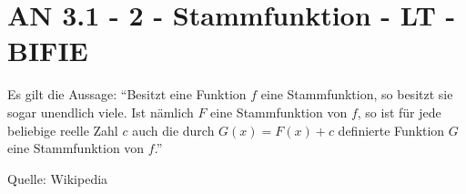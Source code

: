 \section{AN 3.1 - 2 - Stammfunktion - LT - BIFIE}

\begin{beispiel}[AN 3.1]{1} %
Es gilt die Aussage:
"`Besitzt eine Funktion $f$ eine Stammfunktion, so besitzt sie sogar unendlich viele. Ist nämlich $F$ eine Stammfunktion von $f$, so ist für jede beliebige reelle Zahl $c$ auch die durch $G(x) = F(x) + c$ definierte Funktion $G$ eine Stammfunktion von $f$."'
\begin{flushright}
\tiny{Quelle: Wikipedia}
\end{flushright}


 \end{beispiel}